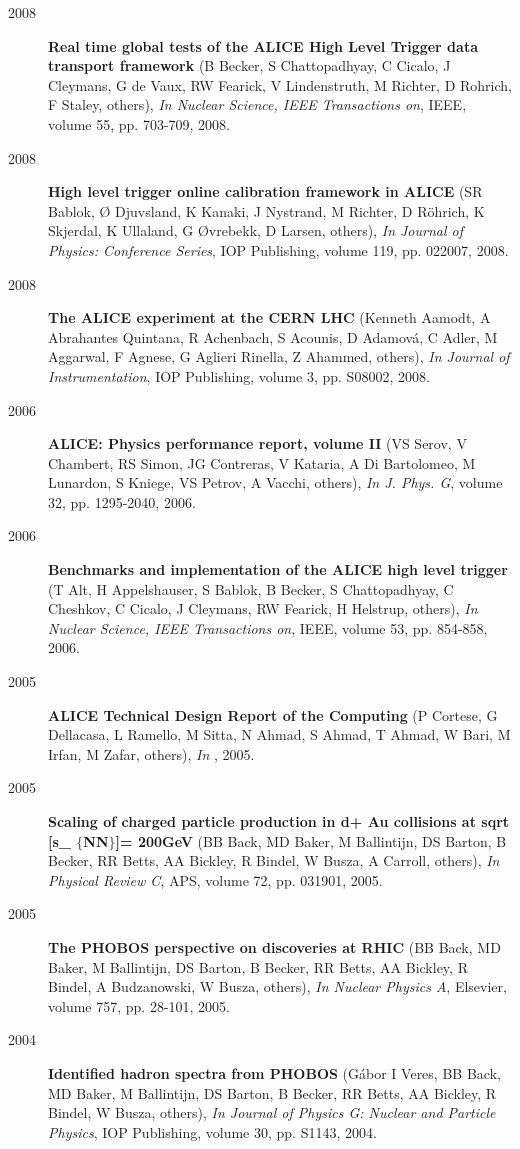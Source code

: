 \begin{description}
\item[2008]{\bf Real time global tests of the ALICE High Level Trigger data transport framework} (B Becker, S Chattopadhyay, C Cicalo, J Cleymans, G de Vaux, RW Fearick, V Lindenstruth, M Richter, D Rohrich, F Staley, others), {\em In Nuclear Science, IEEE Transactions on}, IEEE, volume 55, pp. 703-709, 2008.
\item[2008]{\bf High level trigger online calibration framework in ALICE} (SR Bablok, Ø Djuvsland, K Kanaki, J Nystrand, M Richter, D Röhrich, K Skjerdal, K Ullaland, G Øvrebekk, D Larsen, others), {\em In Journal of Physics: Conference Series}, IOP Publishing, volume 119, pp. 022007, 2008.
\item[2008]{\bf The ALICE experiment at the CERN LHC} (Kenneth Aamodt, A Abrahantes Quintana, R Achenbach, S Acounis, D Adamová, C Adler, M Aggarwal, F Agnese, G Aglieri Rinella, Z Ahammed, others), {\em In Journal of Instrumentation}, IOP Publishing, volume 3, pp. S08002, 2008.
\item[2006]{\bf ALICE: Physics performance report, volume II} (VS Serov, V Chambert, RS Simon, JG Contreras, V Kataria, A Di Bartolomeo, M Lunardon, S Kniege, VS Petrov, A Vacchi, others), {\em In J. Phys. G}, volume 32, pp. 1295-2040, 2006.
\item[2006]{\bf Benchmarks and implementation of the ALICE high level trigger} (T Alt, H Appelshauser, S Bablok, B Becker, S Chattopadhyay, C Cheshkov, C Cicalo, J Cleymans, RW Fearick, H Helstrup, others), {\em In Nuclear Science, IEEE Transactions on}, IEEE, volume 53, pp. 854-858, 2006.
\item[2005]{\bf ALICE Technical Design Report of the Computing} (P Cortese, G Dellacasa, L Ramello, M Sitta, N Ahmad, S Ahmad, T Ahmad, W Bari, M Irfan, M Zafar, others), {\em In }, 2005.
\item[2005]{\bf Scaling of charged particle production in d+ Au collisions at sqrt [s\_ $\{$NN$\}$]= 200GeV} (BB Back, MD Baker, M Ballintijn, DS Barton, B Becker, RR Betts, AA Bickley, R Bindel, W Busza, A Carroll, others), {\em In Physical Review C}, APS, volume 72, pp. 031901, 2005.
\item[2005]{\bf The PHOBOS perspective on discoveries at RHIC} (BB Back, MD Baker, M Ballintijn, DS Barton, B Becker, RR Betts, AA Bickley, R Bindel, A Budzanowski, W Busza, others), {\em In Nuclear Physics A}, Elsevier, volume 757, pp. 28-101, 2005.
\item[2004]{\bf Identified hadron spectra from PHOBOS} (Gábor I Veres, BB Back, MD Baker, M Ballintijn, DS Barton, B Becker, RR Betts, AA Bickley, R Bindel, W Busza, others), {\em In Journal of Physics G: Nuclear and Particle Physics}, IOP Publishing, volume 30, pp. S1143, 2004.

\end{description}
